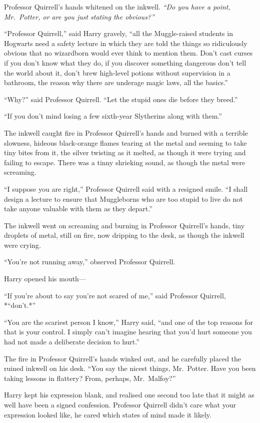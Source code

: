 Professor Quirrell's hands whitened on the inkwell. \emph{``Do you have
a point, Mr.~Potter, or are you just stating the obvious?''}

``Professor Quirrell,'' said Harry gravely, ``all the Muggle-raised
students in Hogwarts need a safety lecture in which they are told the
things so ridiculously obvious that no wizardborn would ever think to
mention them. Don't cast curses if you don't know what they do, if you
discover something dangerous don't tell the world about it, don't brew
high-level potions without supervision in a bathroom, the reason why
there are underage magic laws, all the basics.''

``Why?'' said Professor Quirrell. ``Let the stupid ones die before they
breed.''

``If you don't mind losing a few sixth-year Slytherins along with
them.''

The inkwell caught fire in Professor Quirrell's hands and burned with a
terrible slowness, hideous black-orange flames tearing at the metal and
seeming to take tiny bites from it, the silver twisting as it melted, as
though it were trying and failing to escape. There was a tinny shrieking
sound, as though the metal were screaming.

``I suppose you are right,'' Professor Quirrell said with a resigned
smile. ``I shall design a lecture to ensure that Muggleborns who are too
stupid to live do not take anyone valuable with them as they depart.''

The inkwell went on screaming and burning in Professor Quirrell's hands,
tiny droplets of metal, still on fire, now dripping to the desk, as
though the inkwell were crying.

``You're not running away,'' observed Professor Quirrell.

Harry opened his mouth---

``If you're about to say you're not scared of me,'' said Professor
Quirrell, *``don't.*''

``You are the scariest person I know,'' Harry said, ``and one of the top
reasons for that is your control. I simply can't imagine hearing that
you'd hurt someone you had not made a deliberate decision to hurt.''

The fire in Professor Quirrell's hands winked out, and he carefully
placed the ruined inkwell on his desk. ``You say the nicest things,
Mr.~Potter. Have you been taking lessons in flattery? From, perhaps,
Mr.~Malfoy?''

Harry kept his expression blank, and realised one second too late that
it might as well have been a signed confession. Professor Quirrell
didn't care what your expression looked like, he cared which states of
mind made it likely.

